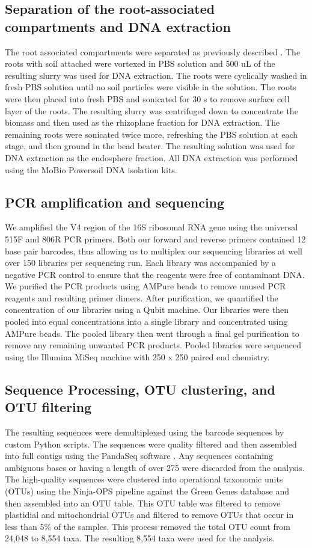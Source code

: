 \subsection{Separation of the root-associated compartments and DNA extraction}
%
The root associated compartments were separated as previously described \cite{Edwards2015}. The roots with soil attached were vortexed in PBS solution and 500 uL of the resulting slurry was used for DNA extraction. The roots were cyclically washed in fresh PBS solution until no soil particles were visible in the solution. The roots were then placed into fresh PBS and sonicated for 30 s to remove surface cell layer of the roots. The resulting slurry was centrifuged down to concentrate the biomass and then used as the rhizoplane fraction for DNA extraction. The remaining roots were sonicated twice more, refreshing the PBS solution at each stage, and then ground in the bead beater. The resulting solution was used for DNA extraction as the endosphere fraction. All DNA extraction was performed using the MoBio Powersoil DNA isolation kits.

\subsection{PCR amplification and sequencing}
%
We amplified the V4 region of the 16S ribosomal RNA gene using the universal 515F and 806R PCR primers. Both our forward and reverse primers contained 12 base pair barcodes, thus allowing us to multiplex our sequencing libraries at well over 150 libraries per sequencing run. Each library was accompanied by a negative PCR control to ensure that the reagents were free of contaminant DNA. We purified the PCR products using AMPure beads to remove unused PCR reagents and resulting primer dimers. After purification, we quantified the concentration of our libraries using a Qubit machine. Our libraries were then pooled into equal concentrations into a single library and concentrated using AMPure beads. The pooled library then went through a final gel purification to remove any remaining unwanted PCR products. Pooled libraries were sequenced using the Illumina MiSeq machine with 250 x 250 paired end chemistry. 

\subsection{Sequence Processing, OTU clustering, and OTU filtering}
%
The resulting sequences were demultiplexed using the barcode sequences by custom Python scripts. The sequences were quality filtered and then assembled into full contigs using the PandaSeq software \cite{Masella2012}. Any sequences containing ambiguous bases or having a length of over 275 were discarded from the analysis. The high-quality sequences were clustered into operational taxonomic units (OTUs) using the Ninja-OPS pipeline \cite{Al-Ghalith2016} against the Green Genes database \cite{DeSantis2006} and then assembled into an OTU table. This OTU table was filtered to remove plastidial and mitochondrial OTUs and filtered to remove OTUs that occur in less than 5\% of the samples. This process removed the total OTU count from 24,048 to 8,554 taxa. The resulting 8,554 taxa were used for the analysis.

